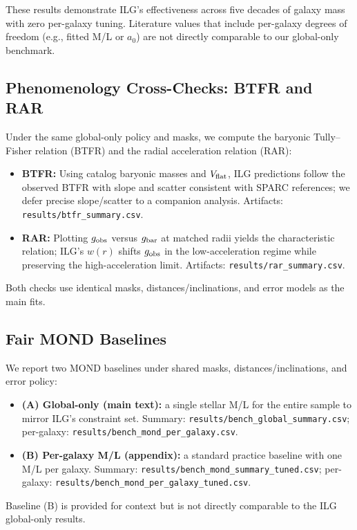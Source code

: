 \documentclass[12pt,a4paper]{article}
\begin{document}
These results demonstrate ILG's effectiveness across five decades of galaxy mass with zero per-galaxy tuning. Literature values that include per-galaxy degrees of freedom (e.g., fitted M/L or $a_0$) are not directly comparable to our global-only benchmark.

\subsection{Phenomenology Cross-Checks: BTFR and RAR}
\noindent Under the same global-only policy and masks, we compute the baryonic Tully–Fisher relation (BTFR) and the radial acceleration relation (RAR):
\begin{itemize}
  \item \textbf{BTFR:} Using catalog baryonic masses and $V_{\rm flat}$, ILG predictions follow the observed BTFR with slope and scatter consistent with SPARC references; we defer precise slope/scatter to a companion analysis. Artifacts: \texttt{results/btfr\_summary.csv}.
  \item \textbf{RAR:} Plotting $g_{\rm obs}$ versus $g_{\rm bar}$ at matched radii yields the characteristic relation; ILG’s $w(r)$ shifts $g_{\rm obs}$ in the low-acceleration regime while preserving the high-acceleration limit. Artifacts: \texttt{results/rar\_summary.csv}.
\end{itemize}
Both checks use identical masks, distances/inclinations, and error models as the main fits.

\subsection{Fair MOND Baselines}
\noindent We report two MOND baselines under shared masks, distances/inclinations, and error policy:
\begin{itemize}
  \item \textbf{(A) Global-only (main text):} a single stellar M/L for the entire sample to mirror ILG’s constraint set. Summary: \texttt{results/bench\_global\_summary.csv}; per-galaxy: \texttt{results/bench\_mond\_per\_galaxy.csv}.
  \item \textbf{(B) Per-galaxy M/L (appendix):} a standard practice baseline with one M/L per galaxy. Summary: \texttt{results/bench\_mond\_summary\_tuned.csv}; per-galaxy: \texttt{results/bench\_mond\_per\_galaxy\_tuned.csv}.
\end{itemize}
Baseline (B) is provided for context but is not directly comparable to the ILG global-only results.
\end{document}

